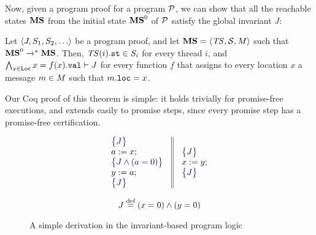 Now, given a program proof for a program $\mathcal{P}$, we can show that
all the reachable states ${\mathbf{MS}}$ from the initial state ${\mathbf{MS}}^0$ of $\mathcal{P}$
satisfy the global invariant $J$:

\begin{theorem}[Soundness]
Let ${\langle{J,S_1,S_2,\ldots}\rangle}$ be a program proof, 
and let ${\mathbf{MS}}={\langle{\mathit{TS},{\cal S},M}\rangle}$ such that ${\mathbf{MS}}^0 \xrightarrow{}^* {\mathbf{MS}}$.
Then, $\mathit{TS}(i).\texttt{st} \in S_i$ for every thread $i$, and 
$\bigwedge_{x\in{\mathsf{Loc}}} x=f(x).{\texttt{val}} \vdash J$
for every function $f$ that assigns to every location $x$ a message $m\in M$ such that $m.{\texttt{loc}}=x$.
\end{theorem}

Our Coq proof of this theorem is simple:
it holds trivially for promise-free executions,
and extends easily to promise steps, since every promise step has a promise-free certification.

\begin{figure}[t]
\centering
\small
\begin{minipage}{0.55\columnwidth}
 \[
\begin{array}{c}
\begin{array}{c||c}
 \begin{array}{l}
\asrt{J } \\
a:=x; \\
\asrt{J \land (a=0)} \\
y:=a; \\
\asrt{J} 
 \end{array}&
 \begin{array}{l}
\asrt{J } \\
x:=y;  \\
\asrt{J } 
 \end{array}
 \end{array}
 \end{array}
 \]
 \end{minipage}
\begin{minipage}{0.40\columnwidth}
$$ J \stackrel{\text{def}}{=} \left( x=0\right) \land \left(y=0\right)$$ 
 \end{minipage}
\caption{A simple derivation in the invariant-based program logic}
\label{fig:logic}
\end{figure}


%
%
%
%
%
%
%




